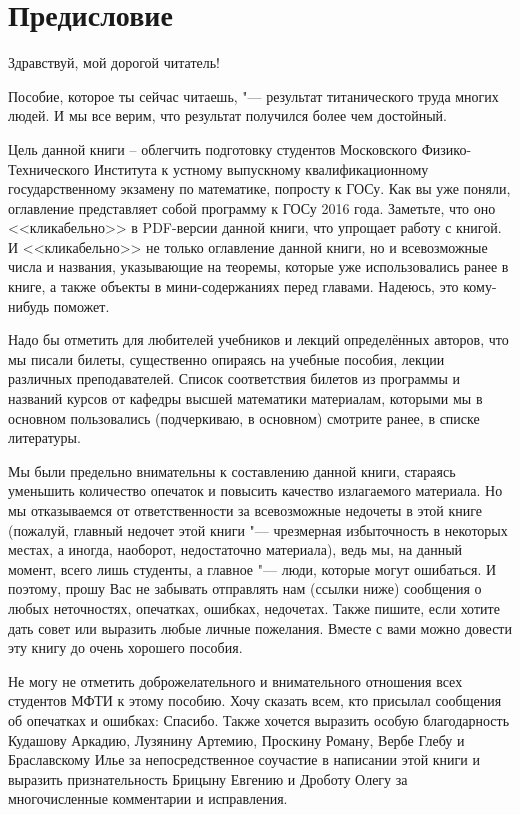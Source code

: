 \chapter{Предисловие}

\begin{center} 
	Здравствуй, мой дорогой читатель!
\end{center}

Пособие, которое ты сейчас читаешь, "--- результат титанического труда многих людей. И мы все верим, что результат получился более чем достойный. 

Цель данной книги – облегчить подготовку студентов Московского Физико-Технического Института к устному выпускному квалификационному государственному экзамену по математике, попросту к ГОСу. Как вы уже поняли, оглавление представляет собой программу к ГОСу 2016 года. Заметьте, что оно <<кликабельно>> в PDF-версии данной книги, что упрощает работу с книгой. И <<кликабельно>> не только оглавление данной книги, но и всевозможные числа и названия, указывающие на теоремы, которые уже использовались ранее в книге, а также объекты в мини-содержаниях перед главами. Надеюсь, это кому-нибудь поможет. 

Надо бы отметить для любителей учебников и лекций определённых авторов, что мы писали билеты, существенно опираясь на учебные пособия, лекции различных преподавателей. Список соответствия билетов из программы и названий курсов от кафедры высшей математики материалам, которыми мы в основном пользовались (подчеркиваю, в основном) смотрите ранее, в списке литературы.

Мы были предельно внимательны к составлению данной книги, стараясь уменьшить количество опечаток и повысить качество излагаемого материала. Но мы отказываемся от ответственности за всевозможные недочеты в этой книге (пожалуй, главный недочет этой книги "--- чрезмерная избыточность в некоторых местах, а иногда, наоборот, недостаточно материала), ведь мы, на данный момент, всего лишь студенты, а главное "--- люди, которые могут ошибаться. И поэтому, прошу Вас не забывать отправлять нам (ссылки ниже) сообщения о любых неточностях, опечатках, ошибках, недочетах. Также пишите, если хотите дать совет или выразить любые личные пожелания. Вместе с вами можно довести эту книгу до очень хорошего пособия.

Не могу не отметить доброжелательного и внимательного отношения всех студентов МФТИ к этому пособию. Хочу сказать всем, кто присылал сообщения об опечатках и ошибках: \glqq Спасибо\grqq. Также хочется выразить особую благодарность Кудашову Аркадию, Лузянину Артемию, Проскину Роману, Вербе Глебу и Браславскому Илье за непосредственное соучастие в написании этой книги и выразить признательность Брицыну Евгению и Дроботу Олегу за многочисленные комментарии и исправления.


